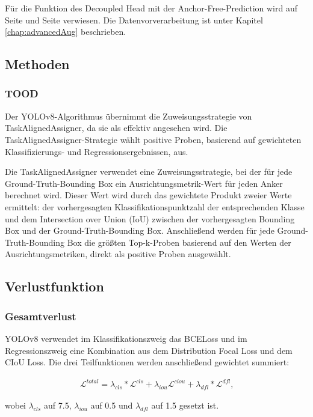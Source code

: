Für die Funktion des Decoupled Head mit der Anchor-Free-Prediction wird auf Seite \pageref{chap:decoupledHead} und Seite \pageref{chap:anchorFree} verwiesen. Die Datenvorverarbeitung ist unter Kapitel \ref{chap:advancedAug} beschrieben. 

\subsection{Methoden}
\subsubsection{TOOD}
Der YOLOv8-Algorithmus übernimmt die Zuweisungsstrategie von TaskAlignedAssigner, da sie als effektiv angesehen wird. Die TaskAlignedAssigner-Strategie wählt positive Proben, basierend auf gewichteten Klassifizierungs- und Regressionsergebnissen, aus. 

Die TaskAlignedAssigner verwendet eine Zuweisungsstrategie, bei der für jede Ground-Truth-Bounding Box ein Ausrichtungsmetrik-Wert für jeden Anker berechnet wird. Dieser Wert wird durch das gewichtete Produkt zweier Werte ermittelt: der vorhergesagten Klassifikationspunktzahl der entsprechenden Klasse und dem Intersection over Union (IoU) zwischen der vorhergesagten Bounding Box und der Ground-Truth-Bounding Box. Anschließend werden für jede Ground-Truth-Bounding Box die größten Top-k-Proben basierend auf den Werten der Ausrichtungsmetriken, direkt als positive Proben ausgewählt. \cite{yolov8ModelExplanation, yolov8LabelAssignment}

\subsection{Verlustfunktion}
\subsubsection{Gesamtverlust}
YOLOv8 verwendet im Klassifikationszweig das BCELoss und im Regressionszweig eine Kombination aus dem Distribution Focal Loss und dem CIoU Loss. Die drei Teilfunktionen werden anschließend gewichtet summiert:

\begin{align}
	\mathcal{L}^{total}=\lambda_{cls}*\mathcal{L}^{cls}+\lambda_{iou}\mathcal{L}^{ciou}+	\lambda_{dfl}*\mathcal{L}^{dfl} \text{,}
\end{align}

wobei $\lambda_{cls}$ auf 7.5, $\lambda_{iou}$ auf 0.5 und $\lambda_{dfl}$ auf 1.5 gesetzt ist.

